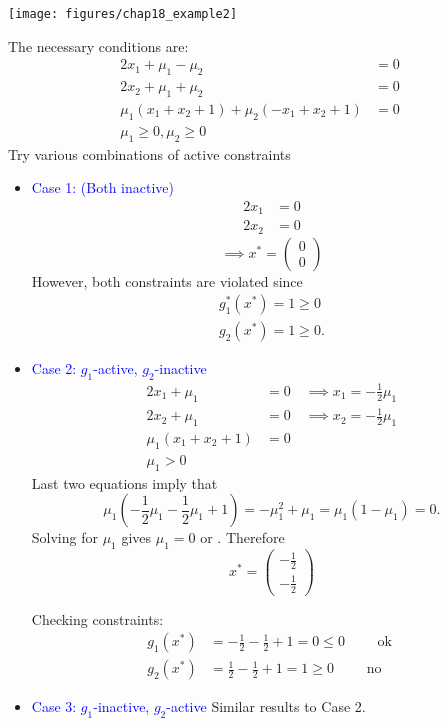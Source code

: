 \documentclass{article}
\begin{document}
	\begin{center}
		\texttt{[image: figures/chap18\_example2]}
	\end{center}

	The necessary conditions are:
	\begin{align*}
		2x_1 + \mu_1 - \mu_2 &= 0\\
		2x_2 + \mu_1 + \mu_2 &= 0\\
		\mu_1(x_1 + x_2 + 1) + \mu_2(-x_1 + x_2 + 1) &= 0\\
		\mu_1 \geq 0, \mu_2 \geq 0
	\end{align*}	
	Try various combinations of active constraints
	\begin{itemize}
	\item\textcolor{blue}{Case 1: (Both inactive) }
	\begin{align*}
		2x_1 &= 0\\
		2x_2 &= 0
	\end{align*}
	\[ \implies x^{\ast} = \begin{pmatrix}
	    0\\0
	  \end{pmatrix}
	\]
	However, both constraints are violated since
	\begin{align*}
		g_1^{\ast}(x^{\ast}) = 1 \geq 0\\
		g_2(x^{\ast}) = 1 \geq 0.
	\end{align*}

	\item \textcolor{blue}{Case 2: $g_1$-active, $g_2$-inactive}
	\begin{align*}
		2x_1 + \mu_1 &= 0 \quad\implies x_1 = -\frac{1}{2}\mu_1 \\
		2x_2 + \mu_1 &= 0 \quad\implies x_2 = -\frac{1}{2}\mu_1\\
		\mu_1(x_1 + x_2 + 1) &= 0\\
		\mu_1 > 0
	\end{align*}
	Last two equations imply that
	\[ 
	\mu_1(-\frac{1}{2}\mu_1-\frac{1}{2}\mu_1 + 1) = -\mu_1^2 + \mu_1 = \mu_1(1-\mu_1) = 0.
	\]
	Solving for $\mu_1$ gives $\mu_1 = 0$ or .
	Therefore 
	\[
		x^{\ast} = 
			\begin{pmatrix}
	    		-\frac{1}{2} \\
	    		-\frac{1}{2}
	  		\end{pmatrix}
	\]	

	Checking constraints:
	\begin{align*}
		g_1(x^{\ast}) &= -\frac{1}{2} -\frac{1}{2} + 1 = 0 \leq 0 \qquad \text{ ok }\\
		g_2(x^{\ast}) &= \frac{1}{2} -\frac{1}{2} + 1 = 1 \geq 0 \qquad \text{ no }
	\end{align*}	
	\item \textcolor{blue}{Case 3: $g_1$-inactive, $g_2$-active}
	 Similar results to Case 2.
	 

\end{itemize}
\end{document}

